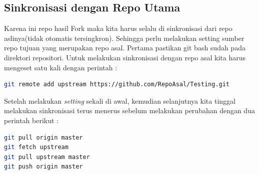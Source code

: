 \subsection{Sinkronisasi dengan Repo Utama}
Karena ini repo hasil Fork maka kita harus selalu di sinkronisasi dari repo aslinya(tidak otomatis tersingkron). Sehingga perlu melakukan setting sumber repo tujuan yang merupakan repo asal. Pertama pastikan git bash sudah pada direktori repositori. Untuk melakukan sinkronisasi dengan repo asal kita harus mengeset satu kali dengan perintah :

\begin{lstlisting}[language=bash, caption=Set Repo Asal Sebagai Upstream,breaklines]
git remote add upstream https://github.com/RepoAsal/Testing.git
\end{lstlisting}

Setelah melakukan \textit{setting} sekali di awal, kemudian selanjutnya kita tinggal melakukan sinkronisasi terus menerus sebelum melakukan perubahan dengan dua perintah berikut :

\begin{lstlisting}[language=sh, caption=Perintah Sinkronisasi dengan repo asal,breaklines]
git pull origin master
git fetch upstream
git pull upstream master
git push origin master
\end{lstlisting}


